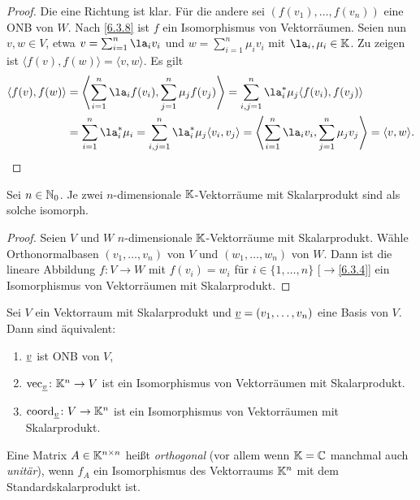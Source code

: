 \documentclass[../../main.tex]{subfiles}
\begin{document}
\begin{proof}
Die eine Richtung ist klar. Für die andere sei $(f(v_1),\dots,f(v_n))$ eine ONB von $W$. Nach \ref{6.3.8} ist $f$ ein Isomorphismus von Vektorräumen.
Seien nun $v,w\in V$, etwa $v=\sum_{i=1}^n\la_iv_i$ und $w=\sum_{i=1}^n\mu_iv_i$ mit $\la_i,\mu_i\in\K$. Zu zeigen ist $\langle f(v),f(w)\rangle=\langle v,w\rangle$. Es gilt
\begin{align*}
\langle f(v),f(w)\rangle&=\left\langle\sum_{i=1}^n\la_if(v_i),\sum_{j=1}^n\mu_jf(v_j)\right\rangle=\sum_{i,j=1}^n\la_i^*\mu_j\langle f(v_i),f(v_j)\rangle\\
&=\sum_{i=1}^n\la_i^*\mu_i=\sum_{i,j=1}^n\la_i^*\mu_j\langle v_i,v_j\rangle=\left\langle\sum_{i=1}^n\la_iv_i,\sum_{j=1}^n\mu_jv_j\right\rangle=\langle v,w\rangle.
\end{align*}
\end{proof}

\begin{kor}\label{11.2.23} Sei $n\in\mathbb N_0$. Je zwei $n$-dimensionale $\mathbb K$-Vektorräume mit Skalarprodukt sind als solche isomorph.
\end{kor}

\begin{proof}
Seien $V$ und $W$ $n$-dimensionale $\mathbb K$-Vektorräume mit Skalarprodukt. Wähle Orthonormalbasen $(v_1,\dots,v_n)$ von $V$ und $(w_1,\dots,w_n)$ von $W$. Dann ist die lineare
Abbildung $f\colon V\to W$ mit $f(v_i)=w_i$ für $i\in\{1,\dots,n\}$ [$\to$\ref{6.3.4}] ein Isomorphismus von Vektorräumen mit Skalarprodukt.
\end{proof}

\begin{kor}\label{11.2.24}
Sei $V$ ein Vektorraum mit Skalarprodukt und ${\underline v}=(v_1,\dots,v_n)$ eine Basis von $V$. Dann sind äquivalent:
\begin{enumerate}[\rm(a)]
\item ${\underline v}$ ist ONB von $V$,
\item $\operatorname{vec}_{\underline v}\colon\mathbb K^n\to V$ ist ein Isomorphismus von Vektorräumen mit Skalarprodukt.
\item $\operatorname{coord}_{\underline v}\colon V\to\mathbb K^n$ ist ein Isomorphismus von Vektorräumen mit Skalarprodukt.
\end{enumerate}
\end{kor}

\begin{df}\label{11.2.25}
Eine Matrix $A\in\mathbb K^{n\times n}$ heißt \emph{orthogonal} (vor allem wenn $\mathbb K=\mathbb C$ manchmal auch \emph{unitär}), wenn $f_A$ ein Isomorphismus des Vektorraums $\mathbb K^n$
mit dem Standardskalarprodukt ist.
\end{df}
\end{document}
